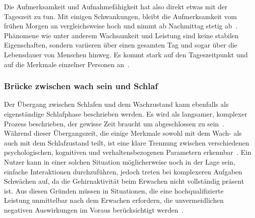 Die Aufmerksamkeit und Aufnahmefähigkeit hat also direkt etwas mit der Tageszeit zu tun.
Mit einigen Schwankungen, bleibt die Aufmerksamkeit vom frühen Morgen an vergleichsweise hoch und nimmt ab Nachmittag stetig ab~\cite{kraemer2000time}.
Phänomene wie unter anderem Wachsamkeit und Leistung sind keine stabilen Eigenschaften, sondern variieren über einen gesamten Tag und sogar über die Lebensdauer von Menschen hinweg. 
Es kommt stark auf den Tageszeitpunkt und auf die Merkmale einzelner Personen an~\cite{kraemer2000time}.

\subsubsection{Brücke zwischen wach sein und Schlaf}
Der Übergang zwischen Schlafen und dem Wachzustand kann ebenfalls als eigenständige Schlafphase beschrieben werden. Es wird als langsamer, komplexer Prozess beschrieben, der gewisse Zeit braucht um abgeschlossen zu sein~\cite{ferrara2000sleep}. 
Während dieser Übergangszeit, die einige Merkmale sowohl mit dem Wach- als auch mit dem Schlafzustand teilt, ist eine klare Trennung zwischen verschiedenen psychologischen, kognitiven und verhaltensbezogenen Parametern erkennbar~\cite{ferrara2000sleep}. 
Ein Nutzer kann in einer solchen Situation möglicherweise noch in der Lage sein, einfache Interaktionen durchzuführen, jedoch treten bei komplexeren Aufgaben Schwächen auf, da die Gehirnaktivität beim Erwachen nicht vollständig präsent ist. 
Aus diesen Gründen müssen in Situationen, die eine hochqualifizierte Leistung unmittelbar nach dem Erwachen erfordern, die unvermeidlichen negativen Auswirkungen im Voraus berücksichtigt werden~\cite{ferrara2000sleep}. 
